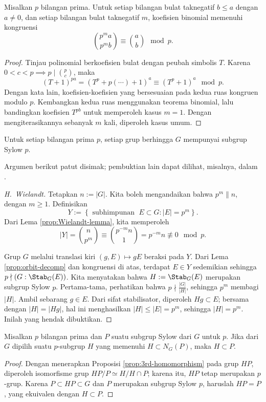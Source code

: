 \begin{lemma}\label{prop:Wielandt-lemma}
	Misalkan $p$ bilangan prima. Untuk setiap bilangan bulat taknegatif $b \leq a$ dengan $a \neq 0$, dan setiap bilangan bulat taknegatif $m$, koefisien binomial memenuhi kongruensi
	\[ \binom{p^m a}{p^m b} \equiv \binom{a}{b} \mod p. \]
\end{lemma}
\begin{proof}
	Tinjau polinomial berkoefisien bulat dengan peubah simbolis $T$. Karena $0 < c < p \implies p \mid \binom{p}{c}$, maka
	\[ (T+1)^{pa} = \left( T^p + p(\cdots) + 1 \right)^a \equiv (T^p + 1)^a \mod p. \]
	Dengan kata lain, koefisien-koefisien yang bersesuaian pada kedua ruas kongruen modulo $p$. Kembangkan kedua ruas menggunakan teorema binomial, lalu bandingkan koefisien $T^{pb}$ untuk memperoleh kasus $m=1$. Dengan mengiterasikannya sebanyak $m$ kali, diperoleh kasus umum.
\end{proof}

\begin{theorem}
	Untuk setiap bilangan prima $p$, setiap grup berhingga $G$ mempunyai subgrup Sylow $p$.
\end{theorem}
Argumen berikut patut disimak; pembuktian lain dapat dilihat, misalnya, dalam \cite[Theorem 6.2]{Lang02}.
\begin{proof}[H.\ Wielandt]
	Tetapkan $n := |G|$. Kita boleh mengandaikan bahwa $p^m \| n$, dengan $m \geq 1$. Definisikan
	\[ Y := \left\{ \text{ subhimpunan } \; E \subset G : |E|=p^m \right\}. \]
	Dari Lema \ref{prop:Wielandt-lemma}, kita memperoleh
	\[ |Y| = \binom{n}{p^m} \equiv \binom{p^{-m} n}{1} = p^{-m} n \not\equiv 0 \mod p . \]

	Grup $G$ melalui translasi kiri $(g, E) \mapsto gE$ beraksi pada $Y$. Dari Lema \ref{prop:orbit-decomp} dan kongruensi di atas, terdapat $E \in Y$ sedemikian sehingga $p \nmid (G: \Stab_G(E))$. Kita menyatakan bahwa $H := \Stab_G(E)$ merupakan subgrup Sylow $p$. Pertama-tama, perhatikan bahwa $p \nmid \frac{|G|}{|H|}$, sehingga $p^m$ membagi $|H|$. Ambil sebarang $g \in E$. Dari sifat stabilisator, diperoleh $Hg \subset E$; bersama dengan $|H|=|Hg|$, hal ini menghasilkan $|H| \leq |E| = p^m$, sehingga $|H|=p^m$. Inilah yang hendak dibuktikan.
\end{proof}

\begin{lemma}
	Misalkan $p$ bilangan prima dan $P$ suatu subgrup Sylow dari $G$ untuk $p$. Jika dari $G$ dipilih suatu $p$-subgrup $H$ yang memenuhi $H \subset N_G(P)$, maka $H \subset P$.
\end{lemma}
\begin{proof}
	Dengan menerapkan Proposisi \ref{prop:3rd-homomorphism} pada grup $HP$, diperoleh isomorfisme grup $HP/P \simeq H/H \cap P$; karena itu, $HP$ tetap merupakan $p$-grup. Karena $P \subset HP \subset G$ dan $P$ merupakan subgrup Sylow $p$, haruslah $HP=P$, yang ekuivalen dengan $H \subset P$.
\end{proof}

